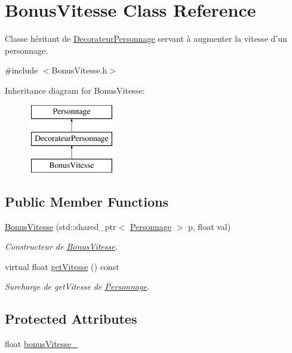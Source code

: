 \hypertarget{classBonusVitesse}{\section{Bonus\-Vitesse Class Reference}
\label{classBonusVitesse}
}


Classe héritant de \hyperlink{classDecorateurPersonnage}{Decorateur\-Personnage} servant à augmenter la vitesse d'un personnage.  




{\ttfamily \#include $<$Bonus\-Vitesse.\-h$>$}

Inheritance diagram for Bonus\-Vitesse\-:\begin{figure}[H]
\begin{center}
\leavevmode
\includegraphics[height=3.000000cm]{classBonusVitesse}
\end{center}
\end{figure}
\subsection*{Public Member Functions}
\begin{DoxyCompactItemize}
\item 
\hyperlink{classBonusVitesse_a67f8ade05afe55e6398740a57e53dd10}{Bonus\-Vitesse} (std\-::shared\-\_\-ptr$<$ \hyperlink{classPersonnage}{Personnage} $>$ p, float val)
\begin{DoxyCompactList}\small\item\em Constructeur de \hyperlink{classBonusVitesse}{Bonus\-Vitesse}. \end{DoxyCompactList}\item 
virtual float \hyperlink{classBonusVitesse_a0cb441c4a830bfc4d50f8ac646e6bc72}{get\-Vitesse} () const 
\begin{DoxyCompactList}\small\item\em Surcharge de get\-Vitesse de \hyperlink{classPersonnage}{Personnage}. \end{DoxyCompactList}\end{DoxyCompactItemize}
\subsection*{Protected Attributes}
\begin{DoxyCompactItemize}
\item 
float \hyperlink{classBonusVitesse_a5942cf6038e6604f6ac10cfa9f05d246}{bonus\-Vitesse\-\_\-}
\end{DoxyCompactItemize}
